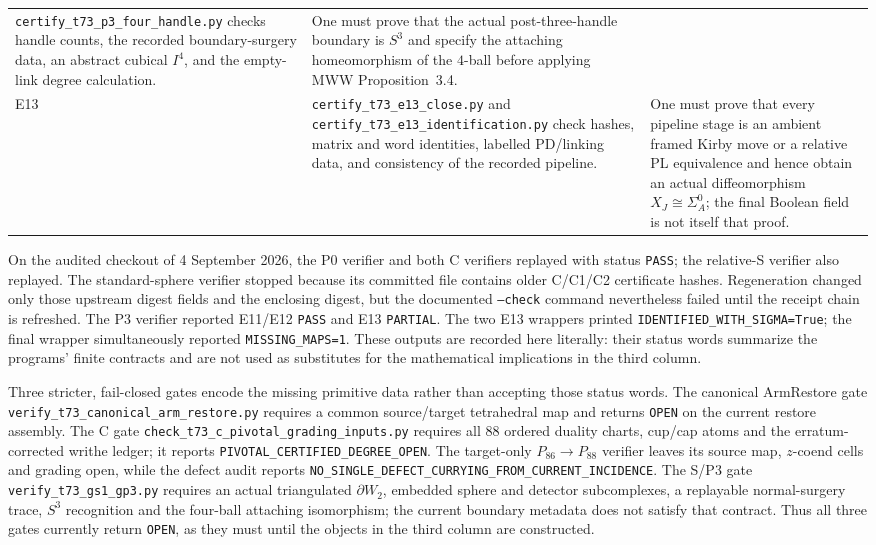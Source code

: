 \documentclass[11pt]{amsart}
\theoremstyle{definition}
\theoremstyle{remark}
\begin{document}
\begin{center}
\begin{tabularx}{\textwidth}{@{}l X X@{}}
\texttt{certify\_t73\_p3\_four\_handle.py} checks handle counts, the recorded
boundary-surgery data, an abstract cubical $I^4$, and the empty-link degree
calculation. &
One must prove that the actual post-three-handle boundary is $S^3$ and specify
the attaching homeomorphism of the $4$-ball before applying MWW
Proposition~3.4. \\
\addlinespace
E13 &
\texttt{certify\_t73\_e13\_close.py} and
\texttt{certify\_t73\_e13\_identification.py} check hashes, matrix and word
identities, labelled PD/linking data, and consistency of the recorded pipeline. &
One must prove that every pipeline stage is an ambient framed Kirby move or a
relative PL equivalence and hence obtain an actual diffeomorphism
$X_J\cong\Sigma_A^0$; the final Boolean field is not itself that proof. \\
\bottomrule
\end{tabularx}
\end{center}

On the audited checkout of 4 September 2026, the P0 verifier and both C
verifiers replayed with status \texttt{PASS}; the relative-S verifier also
replayed.  The standard-sphere verifier stopped because its committed file
contains older C/C1/C2 certificate hashes.  Regeneration changed only those
upstream digest fields and the enclosing digest, but the documented
\texttt{--check} command nevertheless failed until the receipt chain is
refreshed.  The P3 verifier reported E11/E12 \texttt{PASS} and E13
\texttt{PARTIAL}.  The two E13 wrappers printed
\texttt{IDENTIFIED\_WITH\_SIGMA=True}; the final wrapper simultaneously
reported \texttt{MISSING\_MAPS=1}.  These outputs are recorded here literally:
their status words summarize the programs' finite contracts and are not used
as substitutes for the mathematical implications in the third column.

Three stricter, fail-closed gates encode the missing primitive data rather
than accepting those status words.  The canonical ArmRestore gate
\texttt{verify\_t73\_canonical\_arm\_restore.py} requires a common
source/target tetrahedral map and returns \texttt{OPEN} on the current restore
assembly.  The C gate
\texttt{check\_t73\_c\_pivotal\_grading\_inputs.py} requires all 88 ordered
duality charts, cup/cap atoms and the erratum-corrected writhe ledger; it
reports \texttt{PIVOTAL\_CERTIFIED\_DEGREE\_OPEN}.  The target-only
$P_{86}\to P_{88}$ verifier leaves its source map, $z$-coend cells and grading
open, while the defect audit reports
\texttt{NO\_SINGLE\_DEFECT\_CURRYING\_FROM\_CURRENT\_INCIDENCE}.  The S/P3 gate
\texttt{verify\_t73\_gs1\_gp3.py} requires an actual triangulated
$\partial W_2$, embedded sphere and detector subcomplexes, a replayable
normal-surgery trace, $S^3$ recognition and the four-ball attaching
isomorphism; the current boundary metadata does not satisfy that contract.
Thus all three gates currently return \texttt{OPEN}, as they must until the
objects in the third column are constructed.
\end{document}
